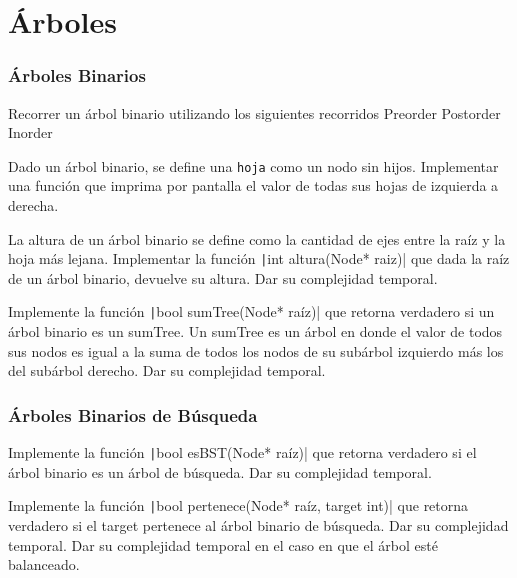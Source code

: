 \documentclass[titlepage,oneside]{book}
\begin{document}
\chapter{Árboles}

\subsection{Árboles Binarios}

\begin{Exercise}
	Recorrer un árbol binario utilizando los siguientes recorridos
	\Question Preorder
	\Question Postorder
        \Question Inorder
\end{Exercise}

\begin{Exercise}
	Dado un árbol binario, se define una \texttt{hoja} como un nodo sin hijos. Implementar una función que imprima por pantalla el valor de todas sus hojas de izquierda a derecha.
\end{Exercise}

\begin{Exercise}
    La altura de un árbol binario se define como la cantidad de ejes entre la raíz y la hoja más lejana. Implementar la función \texttt|int altura(Node* raiz)| que dada la raíz de un árbol binario, devuelve su altura. Dar su complejidad temporal.
\end{Exercise}

\begin{Exercise}
   Implemente la función \texttt|bool sumTree(Node* raíz)| que retorna verdadero si un árbol binario es un sumTree. Un sumTree es un árbol en donde el valor de todos sus nodos es igual a la suma de todos los nodos de su subárbol izquierdo más los del subárbol derecho. Dar su complejidad temporal.
\end{Exercise}

\subsection{Árboles Binarios de Búsqueda}

\begin{Exercise}
   Implemente la función \texttt|bool esBST(Node* raíz)| que retorna verdadero si el árbol binario es un árbol de búsqueda. Dar su complejidad temporal.
\end{Exercise}

\begin{Exercise}
   Implemente la función \texttt|bool pertenece(Node* raíz, target int)| que retorna verdadero si el target pertenece al árbol binario de búsqueda.
   	\Question Dar su complejidad temporal.
	\Question Dar su complejidad temporal en el caso en que el árbol esté balanceado.
\end{Exercise}
\end{document}
